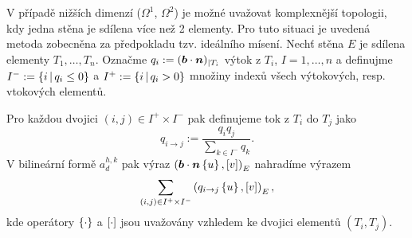V případě nižších dimenzí ($\Omega^1$, $\Omega^2$) je možné uvažovat komplexnější topologii, kdy jedna stěna je sdílena více než 2 elementy.
Pro tuto situaci je uvedená metoda zobecněna za předpokladu tzv. ideálního mísení.
Nechť stěna $E$ je sdílena elementy $T_1,\ldots,T_n$.
Označme $q_i:=(\mathbf{\boldsymbol{b}}\cdot\mathbf{\boldsymbol{n}})_{|T_i}$ výtok z $T_i$, $I=1,\ldots,n$ a definujme $I^-:=\{i\,|\, q_i\le 0\}$ a $I^+:=\{i\,|\, q_i>0\}$ množiny indexů všech výtokových, resp. vtokových elementů.

Pro každou dvojici $(i,j)\in I^+\times I^-$ pak definujeme tok z $T_i$ do $T_j$ jako
$$ q_{i\to j} := \frac{q_i q_j}{\sum_{k\in I^-}{q_k}}. $$
V bilineární formě $a_d^{h,k}$ pak výraz $\left(\mathbf{\boldsymbol{b}}\cdot\mathbf{\boldsymbol{n}}\left\{u\right\},[v]\right)_E$ nahradíme výrazem
$$ \sum_{(i,j)\in I^+\times I^-}\left(q_{i\to j}\left\{u\right\},[v]\right)_E, $$
kde operátory $\left\{\cdot\right\}$ a $[\cdot]$ jsou uvažovány vzhledem ke dvojici elementů $(T_i,T_j)$.

